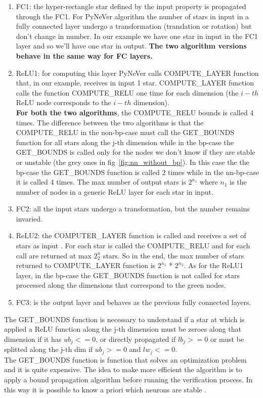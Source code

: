 \begin{enumerate}
	\item FC1: the hyper-rectangle star defined by the input property is propagated through the FC1. For PyNeVer algorithm the number of stars in input in a fully connected layer  undergo a transformation (translation or rotation) but don't change in number. In our example we have one star in input in the FC1 layer and so we'll have one star in output. \textbf{The two algorithm versions behave in the same way for FC layers.}
	\item ReLU1:  for computing this layer PyNeVer calls COMPUTE\_LAYER function that, in our example, receives in input 1 star. COMPUTE\_LAYER function calls the function COMPUTE\_RELU one time for each dimension (the $i-th$ ReLU node corresponds to the $i-th$ dimension). \\
\textbf{For both the two algorithms}, the COMPUTE\_RELU bounds is called 4 times. The difference between the two algorithms is that the COMPUTE\_RELU in the non-bp-case must call the GET\_BOUNDS function for all stars along the j-th dimension while in the bp-case the GET\_BOUNDS is called only for the nodes we don't know if they are stable or unstable (the grey ones in fig~\ref{fig:nn_without_bp}). In this case the the bp-case the GET\_BOUNDS function is called 2 times while in the nn-bp-case it is called 4 times.  The max number of output stars is $2^{n_1}$ where $n_1$ is the number of nodes in a generic ReLU layer for each star in input.
	\item FC2: all the input stars undergo a transformation, but the number remains invaried.
	\item ReLU2: the COMPUTER\_LAYER function is called and receives a set of stars as input . For each star is called the COMPUTE\_RELU and for each call are returned at max $2^n_2$ stars. So in the end, the max number of stars returned to COMPUTE\_LAYER function is $2^{n_1}$ * $2^{n_2}$. As for the ReLU1 layer, in the bp-case the GET\_BOUNDS function is not called for stars processed along the dimensions that correspond to the green nodes.
	\item FC3: is the output layer and behaves as the previous fully connected layers.
\end{enumerate}

The GET\_BOUNDS function is necessary to understand if a star at which is applied a ReLU function along the j-th dimension must be zeroes along that dimension if it has $ub_j<=0$, or directly propagated if $lb_j>=0$ or must be splitted along the j-th dim if $ub_j >=0$ and $lw_j<=0$.\\
The GET\_BOUNDS function is function that solves an optimization problem and it is quite expensive. The idea to make more efficient the algorithm is to apply a bound propagation algorithm before running the verification process. In this way it is possible to know a priori which neurons are stable .

